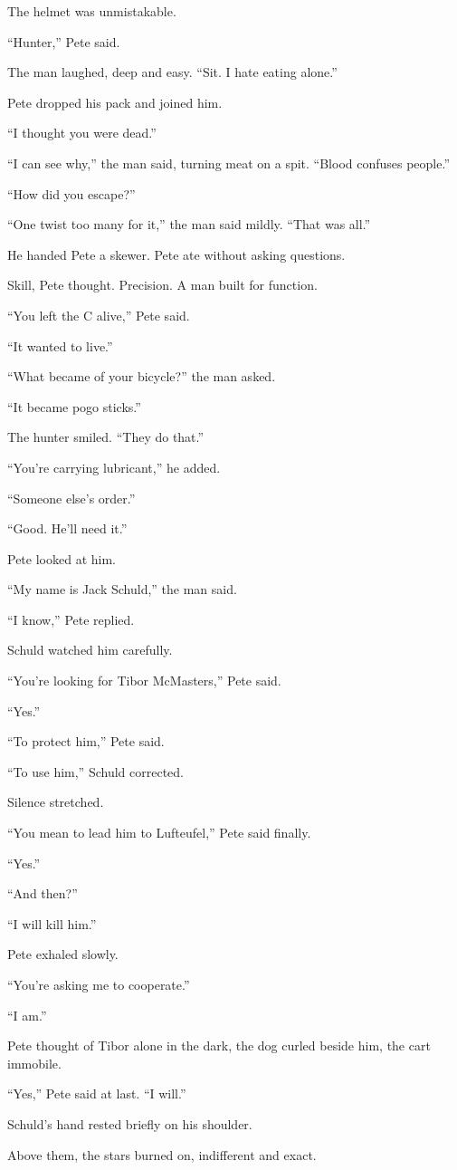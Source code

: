 The helmet was unmistakable.

“Hunter,” Pete said.

The man laughed, deep and easy. “Sit. I hate eating alone.”

Pete dropped his pack and joined him.

“I thought you were dead.”

“I can see why,” the man said, turning meat on a spit. “Blood confuses people.”

“How did you escape?”

“One twist too many for it,” the man said mildly. “That was all.”

He handed Pete a skewer. Pete ate without asking questions.

Skill, Pete thought. Precision. A man built for function.

“You left the C alive,” Pete said.

“It wanted to live.”

“What became of your bicycle?” the man asked.

“It became pogo sticks.”

The hunter smiled. “They do that.”

“You’re carrying lubricant,” he added.

“Someone else’s order.”

“Good. He’ll need it.”

Pete looked at him.

“My name is Jack Schuld,” the man said.

“I know,” Pete replied.

Schuld watched him carefully.

“You’re looking for Tibor McMasters,” Pete said.

“Yes.”

“To protect him,” Pete said.

“To use him,” Schuld corrected.

Silence stretched.

“You mean to lead him to Lufteufel,” Pete said finally.

“Yes.”

“And then?”

“I will kill him.”

Pete exhaled slowly.

“You’re asking me to cooperate.”

“I am.”

Pete thought of Tibor alone in the dark, the dog curled beside him, the cart immobile.

“Yes,” Pete said at last. “I will.”

Schuld’s hand rested briefly on his shoulder.

Above them, the stars burned on, indifferent and exact.

